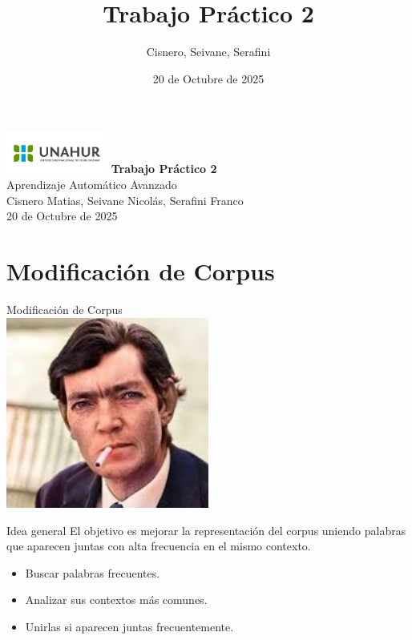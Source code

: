 \documentclass{beamer}
\title{Trabajo Práctico 2}
\author{Cisnero, Seivane, Serafini}
\date{20 de Octubre de 2025}
\begin{document}
\begin{frame}
	\centering
	\includegraphics[width=0.25\textwidth]{UNAHUR (2)}
	\vfill
	{\huge \textbf{Trabajo Práctico 2}}\\[0.2cm]
	{\Large Aprendizaje Automático Avanzado}\\
	\vfill
	{\large Cisnero Matias, Seivane Nicolás, Serafini Franco}\\
	{\small 20 de Octubre de 2025}
\end{frame}


\section{Modificación de Corpus}

\begin{frame}{}
	\centering
	\Large Modificación de Corpus\\
	\vspace{0.8cm}
	\includegraphics[width=0.5\textwidth]{imagen_cortazar}
\end{frame}
	
\begin{frame}{Idea general}
	El objetivo es mejorar la representación del corpus uniendo palabras que aparecen juntas con alta frecuencia en el mismo contexto.
	\begin{itemize}
		\item Buscar palabras frecuentes.
		\item Analizar sus contextos más comunes.
		\item Unirlas si aparecen juntas frecuentemente.
	\end{itemize}
\end{frame}
\end{document}
